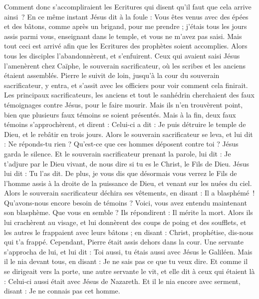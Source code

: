 \begin{multicols}{2}
{Comment donc s’accompliraient les Ecritures qui disent qu'il faut que cela arrive ainsi ?
En ce même instant Jésus dit à la foule : Vous êtes venus avec des épées et des bâtons, comme après un brigand, pour me prendre ; j'étais tous les jours assis parmi vous, enseignant dans le temple, et vous ne m'avez pas saisi.
Mais tout ceci est arrivé afin que les Ecritures des prophètes soient accomplies. Alors tous les disciples l'abandonnèrent, et s'enfuirent.
Ceux qui avaient saisi Jésus l'amenèrent chez Caïphe, le souverain sacrificateur, où les scribes et les anciens étaient assemblés.
Pierre le suivit de loin, jusqu’à la cour du souverain sacrificateur, y entra, et s’assit avec les officiers pour voir comment cela finirait.
Les principaux sacrificateurs, les anciens et tout le sanhédrin cherchaient des faux témoignages contre Jésus, pour le faire mourir.
Mais ils n'en trouvèrent point, bien que plusieurs faux témoins se soient présentés. Mais à la fin, deux faux témoins s'approchèrent,
et dirent : Celui-ci a dit : Je puis détruire le temple de Dieu, et le rebâtir en trois jours.
Alors le souverain sacrificateur se leva, et lui dit : Ne réponds-tu rien ? Qu’est-ce que ces hommes déposent contre toi ?
Jésus garda le silence. Et le souverain sacrificateur prenant la parole, lui dit : Je t’adjure par le Dieu vivant, de nous dire si tu es le Christ, le Fils de Dieu.
Jésus lui dit : Tu l'as dit. De plus, je vous dis que désormais vous verrez le Fils de l'homme assis à la droite de la puissance de Dieu, et venant sur les nuées du ciel.
Alors le souverain sacrificateur déchira ses vêtements, en disant : Il a blasphémé ! Qu’avons-nous encore besoin de témoins ? Voici, vous avez entendu maintenant son blasphème. Que vous en semble ?
Ils répondirent : Il mérite la mort.
Alors ils lui crachèrent au visage, et lui donnèrent des coups de poing et des soufflets, et les autres le frappaient avec leurs bâtons ;
en disant : Christ, prophétise, dis-nous qui t’a frappé.
Cependant, Pierre était assis dehors dans la cour. Une servante s'approcha de lui, et lui dit : Toi aussi, tu étais aussi avec Jésus le Galiléen.
Mais il le nia devant tous, en disant : Je ne sais pas ce que tu veux dire.
Et comme il se dirigeait vers la porte, une autre servante le vit, et elle dit à ceux qui étaient là : Celui-ci aussi était avec Jésus de Nazareth.
Et il le nia encore avec serment, disant : Je ne connais pas cet homme.
}
\end{multicols}
